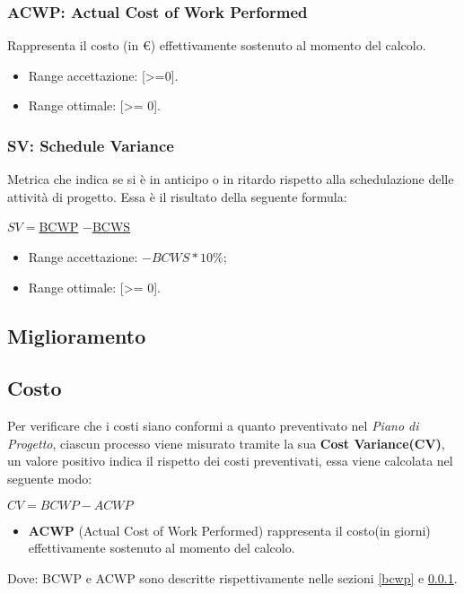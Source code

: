 \subsubsection{ACWP: Actual Cost of Work Performed}\label{acwp}
Rappresenta il costo (in \euro) effettivamente sostenuto al momento del calcolo.
\begin{itemize}
	\item Range accettazione: [>=0].
	\item Range ottimale: [>= 0].
\end{itemize}

\subsubsection{SV: Schedule Variance}
Metrica che indica se si è in anticipo o in ritardo rispetto alla schedulazione delle attività di progetto.
Essa è il risultato della seguente formula:\\
\begin{center}
	
	$SV = $\hyperref[bcwp]{BCWP} $-$\hyperref[bcws]{BCWS}
	
\end{center}

\begin{itemize}
	\item Range accettazione: $-BCWS *10\%$;
	\item Range ottimale: [>= 0].
\end{itemize}



\subsection{Miglioramento}
\subsection{Costo}
Per verificare che i costi siano conformi a quanto preventivato nel \textit{Piano di Progetto}, ciascun processo viene misurato tramite la sua \textbf{Cost Variance(CV)}, un valore positivo indica il rispetto dei costi preventivati, essa viene calcolata nel seguente modo:\\ 

\begin{center}
	\begin{math}
	CV = BCWP - ACWP
	\end{math}
\end{center}
\begin{itemize}
	\item[] \textbf{ACWP} (Actual Cost of Work Performed) rappresenta il costo(in giorni) effettivamente sostenuto al momento del calcolo. 
\end{itemize}
Dove: BCWP e ACWP sono descritte rispettivamente nelle sezioni \ref{bcwp} e \ref{acwp}.

